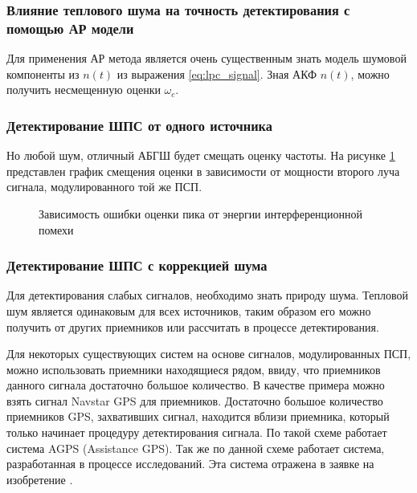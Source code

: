 \subsubsection{Влияние теплового шума на точность детектирования с помощью АР модели}
Для применения АР метода является очень существенным знать модель шумовой компоненты из ${n(t)}$ из выражения
\ref{eq:lpc_signal}. Зная АКФ ${n(t)}$, можно получить несмещенную оценки ${\omega_c}$.

\subsubsection{Детектирование ШПС от одного источника}


Но любой шум, отличный АБГШ будет смещать оценку частоты. На рисунке \ref{pic:lpc_1sat_interference}
представлен график смещения оценки в зависимости от мощности второго луча сигнала, модулированного
той же ПСП.

\begin{figure}[H]
	\center{}
	\caption{Зависимость ошибки оценки пика от энергии интерференционной помехи}
	\label{pic:lpc_1sat_interference}
\end{figure}

\subsubsection{Детектирование ШПС с коррекцией шума}

Для детектирования слабых сигналов, необходимо знать природу шума. Тепловой шум является одинаковым для всех источников,
таким образом его можно получить от других приемников или рассчитать в процессе детектирования. 

Для некоторых существующих систем на основе сигналов, модулированных ПСП, можно использовать приемники находящиеся рядом,
ввиду, что приемников данного сигнала достаточно большое количество. В качестве примера можно взять сигнал Navstar GPS
для приемников. Достаточно большое количество приемников GPS, захвативших сигнал, находится вблизи приемника, который
только начинает процедуру детектирования сигнала. По такой схеме работает система AGPS (Assistance GPS). Так же по данной
схеме работает система, разработанная в процессе исследований. Эта система отражена в заявке на изобретение
\cite{patent_my}.

